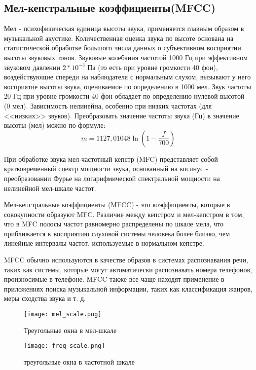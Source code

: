 \subsection{Мел-кепстральные коэффициенты(MFCC)}
\label{sub:domain:overview_mffc}
Мел - психофизическая единица высоты звука, применяется
главным образом в музыкальной акустике. Количественная оценка звука по высоте основана на статистической обработке большого числа данных о субъективном восприятии высоты звуковых тонов. Звуковые колебания частотой 1000 Гц при эффективном звуковом давлении $2 * 10 ^{-3} $ Па (то есть при уровне громкости 40 фон), воздействующие спереди на наблюдателя с нормальным слухом, вызывают у него восприятие высоты звука, оцениваемое по определению в 1000 мел. Звук частоты 20 Гц при уровне громкости 40 фон обладает по определению нулевой высотой (0 мел). Зависимость нелинейна, особенно при низких частотах (для <<низких>> звуков). Преобразовать значение частоты звука (Гц) в значение высоты (мел) можно по формуле:
\begin{equation}\label{eq:mel}
m = 1127,01048 \ln(1 - \frac{f}{700})
\end{equation}

При обработке звука мел-частотный кепстр (MFC) представляет собой кратковременный спектр мощности звука, основанный на косинус - преобразовании Фурье на логарифмической спектральной мощности  на нелинейной мел-шкале частот.

Мел-кепстральные коэффициенты (MFCC) - это коэффициенты, которые в совокупности образуют MFC. Различие между кепстром и мел-кепстром в том, что в MFC полосы частот равномерно распределены по шкале мела, что приближается к восприятию слуховой системы человека более близко, чем линейные интервалы частот, используемые в нормальном кепстре.

MFCC обычно используются в качестве образов в системах распознавания речи, таких как системы, которые могут автоматически распознавать номера телефонов, произносимые в телефоне. MFCC также все чаще находят применение в приложениях поиска музыкальной информации, таких как классификация жанров\cite{mfcc2}, меры сходства звука\cite{mfcc1} и т. д.
\begin{figure}
\centering
  \texttt{[image: mel\_scale.png]}
  \caption{Треугольные окна в мел-шкале}
  \label{fig:domain:mel_scale}
\end{figure}
\begin{figure}
\centering
  \texttt{[image: freq\_scale.png]}
  \caption{треугольные окна в частотной шкале}
  \label{fig:domain:freq_scale}
\end{figure}


